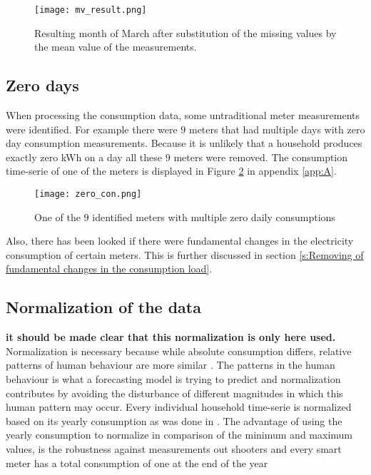 \begin{figure}[h!]
	\centering
	\texttt{[image: mv\_result.png]}
	\caption{Resulting month of March after substitution of the missing values by the mean value of the measurements. }
	\label{fig:mv_result}
\end{figure}


\subsection{Zero days}

When processing the consumption data, some untraditional meter measurements were identified. For example there were $ 9 $ meters that had multiple days with zero day consumption measurements. Because it is unlikely that a household produces exactly zero kWh on a day all these $ 9 $ meters were removed. The consumption time-serie of one of the meters is displayed in Figure \ref{fig:zero_con} in appendix \ref{app:A}.\\

\begin{figure}[h!]
	\centering
	\texttt{[image: zero\_con.png]}
	\vspace*{-5pt}
	\caption{One of the $9$ identified meters with multiple zero daily consumptions}
	\label{fig:zero_con}
\end{figure}




Also, there has been looked if there were fundamental changes in the electricity consumption of certain meters. This is further discussed in section \ref{s:Removing of fundamental changes in the consumption load}.


\subsection{Normalization of the data}
\label{s:Normalization of the data}
\textbf{it should be made clear that this normalization is only here used.}
Normalization is necessary because while absolute consumption differs, relative patterns of human behaviour are more similar \cite{Lago2020}. The patterns in the human behaviour is what a forecasting model is trying to predict and normalization contributes by avoiding the disturbance of different magnitudes in which this human pattern may occur. Every individual household time-serie is normalized based on its yearly consumption as was done in \cite{Lago2020}. The advantage of using the yearly consumption to normalize in comparison of the minimum and maximum values, is the robustness against measurements out shooters and every smart meter has a total consumption of one at the end of the year

